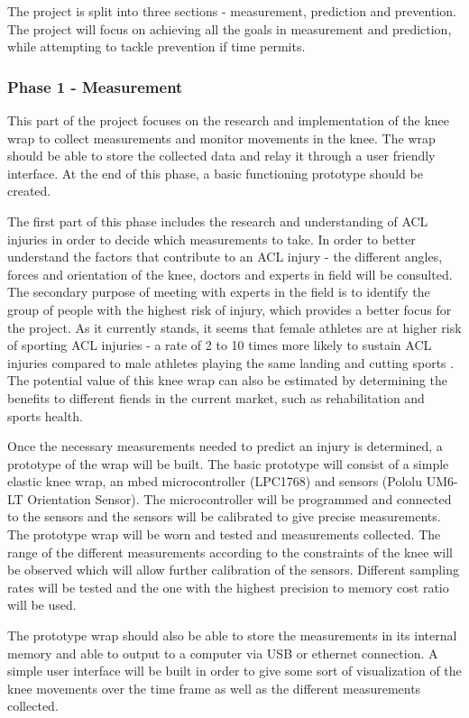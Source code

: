 The project is split into three sections - measurement, prediction and prevention. The project will focus on achieving all the goals in measurement and prediction, while attempting to tackle prevention if time permits.

\subsubsection{Phase 1 - Measurement}
This part of the project focuses on the research and implementation of the knee wrap to collect measurements and monitor movements in the knee. The wrap should be able to store the collected data and relay it through a user friendly interface. At the end of this phase, a basic functioning prototype should be created.

The first part of this phase includes the research and understanding of ACL injuries in order to decide which measurements to take. In order to better understand the factors that contribute to an ACL injury - the different angles, forces and orientation of the knee, doctors and experts in field will be consulted. The secondary purpose of meeting with experts in the field is to identify the group of people with the highest risk of injury, which provides a better focus for the project. As it currently stands, it seems that female athletes are at higher risk of sporting ACL injuries - a rate of 2 to 10 times more likely to sustain ACL injuries compared to male athletes playing the same landing and cutting sports \cite{smaterials}. The potential value of this knee wrap can also be estimated by determining the benefits to different fiends in the current market, such as rehabilitation and sports health.

Once the necessary measurements needed to predict an injury is determined, a prototype of the wrap will be built. The basic prototype will consist of a simple elastic knee wrap, an mbed microcontroller (LPC1768) and sensors (Pololu UM6-LT Orientation Sensor). The microcontroller will be programmed and connected to the sensors and the sensors will be calibrated to give precise measurements. The prototype wrap will be worn and tested and measurements collected. The range of the different measurements according to the constraints of the knee will be observed which will allow further calibration of the sensors. Different sampling rates will be tested and the one with the highest precision to memory cost ratio will be used.

The prototype wrap should also be able to store the measurements in its internal memory and able to output to a computer via USB or ethernet connection. A simple user interface will be built in order to give some sort of visualization of the knee movements over the time frame as well as the different measurements collected.

